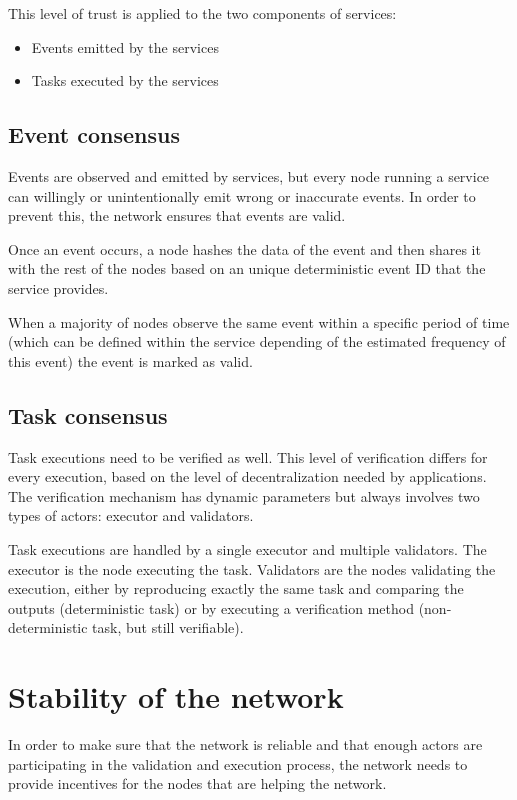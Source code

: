 \documentclass{article}
\begin{document}
This level of trust is applied to the two components of services:

\begin{itemize}
\item Events emitted by the services
\item Tasks executed by the services
\end{itemize}

\subsection{Event consensus}

Events are observed and emitted by services, but every node running a service can willingly or unintentionally emit wrong or inaccurate events. In order to prevent this, the network ensures that events are valid.

Once an event occurs, a node hashes the data of the event and then shares it with the rest of the nodes based on an unique deterministic event ID that the service provides. 

When a majority of nodes observe the same event within a specific period of time (which can be defined within the service depending of the estimated frequency of this event) the event is marked as valid.

\subsection{Task consensus}

Task executions need to be verified as well. This level of verification differs for every execution, based on the level of decentralization needed by applications. The verification mechanism has dynamic parameters but always involves two types of actors: executor and validators.

Task executions are handled by a single executor and multiple validators. The executor is the node executing the task. Validators are the nodes validating the execution, either by reproducing exactly the same task and comparing the outputs (deterministic task) or by executing a verification method (non-deterministic task, but still verifiable).

\section{Stability of the network}

In order to make sure that the network is reliable and that enough actors are participating in the validation and execution process, the network needs to provide incentives for the nodes that are helping the network.
\end{document}
